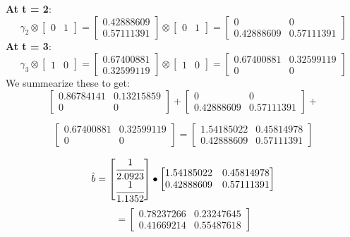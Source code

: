 \textbf{At t = 2}:
\[
\gamma_2 \otimes \begin{bmatrix}
    0 & 1 \end{bmatrix} = \begin{bmatrix}
        0.42888609 \\ 0.57111391
    \end{bmatrix} \otimes \begin{bmatrix}
        0 & 1 \end{bmatrix} = \begin{bmatrix}
            0 & 0 \\ 0.42888609 & 0.57111391
        \end{bmatrix}
\]
\textbf{At t = 3}:
\[
\gamma_3 \otimes \begin{bmatrix}
    1 & 0 \end{bmatrix} = \begin{bmatrix}
        0.67400881 \\ 0.32599119
    \end{bmatrix} \otimes \begin{bmatrix}
        1 & 0 \end{bmatrix} = \begin{bmatrix}
            0.67400881 & 0.32599119 \\ 0 & 0
        \end{bmatrix}
\]
We summearize these to get:
\[
    \begin{bmatrix}
        0.86784141 & 0.13215859 \\
    0 & 0           
    \end{bmatrix} + \begin{bmatrix}
        0 & 0 \\ 0.42888609 & 0.57111391
    \end{bmatrix} +
\] 

\[ \begin{bmatrix}
        0.67400881 & 0.32599119 \\ 0 & 0
    \end{bmatrix} = \begin{bmatrix}    
        1.54185022 & 0.45814978 \\
        0.42888609 & 0.57111391
    \end{bmatrix}
\]

\[
\hat{b} = \begin{bmatrix}
    \cfrac{1}{2.0923} \\ \cfrac{1}{1.1352}
\end{bmatrix} \bullet \begin{bmatrix}    
    1.54185022 & 0.45814978 \\
    0.42888609 & 0.57111391
\end{bmatrix}
\] 
\[ = \begin{bmatrix}
    0.78237266 & 0.23247645 \\
    0.41669214 & 0.55487618
\end{bmatrix}
\]


